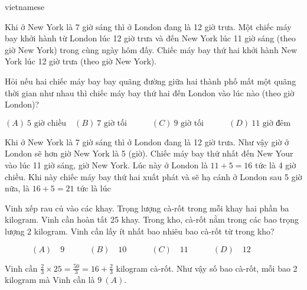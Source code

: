 \documentclass{article}
\begin{document}
\begin{otherlanguage*}{vietnamese}
\bigbreak

\begin{problem*}[PI-2024-C-P13]
    \label{problem:pi-2024-c-p13}

    Khi ở New York là 7 giờ sáng thì ở London đang là 12 giờ trưa.
    Một chiếc máy bay khởi hành từ London lúc 12 giờ trưa và đến New York lúc 11 giờ sáng (theo giờ New York) trong cùng ngày hôm đấy.
    Chiếc máy bay thứ hai khởi hành New York lúc 12 giờ trưa (theo giờ New York).

    Hỏi nếu hai chiếc máy bay bay quãng đường giữa hai thành phố mất một quãng thời gian như nhau thì chiếc máy bay thứ hai đến London vào lúc nào
    (theo giờ London)?

    \[
        (A) \ \text{5 giờ chiều} \quad
        (B) \ \text{7 giờ tối} \qquad \quad
        (C) \ \text{9 giờ tối} \qquad \quad
        (D) \ \text{11 giờ đêm} \qquad \quad
    \]
\end{problem*}

\begin{soln}
    Khi ở New York là 7 giờ sáng thì ở London đang là 12 giờ trưa. Như vậy giờ ở London sẽ hơn giờ New York là 5 (giờ).
    Chiếc máy bay thứ nhất đến New Your vào lúc 11 giờ sáng, giờ New York. Lúc này ở London là $11+5 = 16$ tức là 4 giờ chiều.
    Khi này chiếc máy bay thứ hai xuất phát và sẽ hạ cánh ở London sau 5 giờ nữa, là $16+5=21$ tức là lúc 
\end{soln}

\bigbreak

\begin{problem*}[PI-2024-C-P14]
    \label{problem:pi-2024-c-p14}

    Vinh xếp rau củ vào các khay. Trọng lượng cà-rốt trong mỗi khay hai phần ba kilogram.
    Vinh cần hoàn tất 25 khay. Trong kho, cà-rốt nằm trong các bao trọng lượng 2 kilogram.
    Vinh cần lấy ít nhất bao nhiêu bao cà-rốt từ trong kho?

    \[
        (A) \quad 9 \qquad \quad
        (B) \quad 10 \qquad \quad
        (C) \quad 11 \qquad \quad
        (D) \quad 12 \qquad \quad
    \]
\end{problem*}

\begin{soln}
    Vinh cần $\frac{2}{3} \times 25 = \frac{50}{3} = 16 + \frac{2}{3}$ kilogram cà-rốt.
    Như vậy số bao cà-rốt, mỗi bao 2 kilogram mà Vinh cần là $\boxed{9\ (A).}$
\end{soln}

\bigbreak


\end{otherlanguage*}
\end{document}
